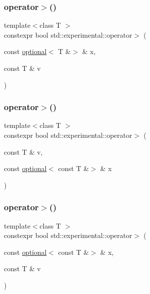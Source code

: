 \mbox{\label{namespacestd_1_1experimental_a733d2aa90d49bd113f2420f996e13a8f}} 
\subsubsection{\texorpdfstring{operator$>$()}{operator>()}\hspace{0.1cm}{\footnotesize\ttfamily [7/9]}}
{\footnotesize\ttfamily template$<$class T $>$ \\
constexpr bool std\+::experimental\+::operator$>$ (\begin{DoxyParamCaption}\item[{const \hyperlink{classstd_1_1experimental_1_1optional}{optional}$<$ T \&$>$ \&}]{x,  }\item[{const T \&}]{v }\end{DoxyParamCaption})}

\mbox{\label{namespacestd_1_1experimental_a3899be1cf909f9d5dc2718c912c73d67}} 
\subsubsection{\texorpdfstring{operator$>$()}{operator>()}\hspace{0.1cm}{\footnotesize\ttfamily [8/9]}}
{\footnotesize\ttfamily template$<$class T $>$ \\
constexpr bool std\+::experimental\+::operator$>$ (\begin{DoxyParamCaption}\item[{const T \&}]{v,  }\item[{const \hyperlink{classstd_1_1experimental_1_1optional}{optional}$<$ const T \&$>$ \&}]{x }\end{DoxyParamCaption})}

\mbox{\label{namespacestd_1_1experimental_ab62a91459215563e8996e69785166789}} 
\subsubsection{\texorpdfstring{operator$>$()}{operator>()}\hspace{0.1cm}{\footnotesize\ttfamily [9/9]}}
{\footnotesize\ttfamily template$<$class T $>$ \\
constexpr bool std\+::experimental\+::operator$>$ (\begin{DoxyParamCaption}\item[{const \hyperlink{classstd_1_1experimental_1_1optional}{optional}$<$ const T \&$>$ \&}]{x,  }\item[{const T \&}]{v }\end{DoxyParamCaption})}

